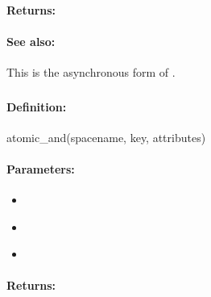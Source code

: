 \paragraph{Returns:}


\paragraph{See also:}  This is the asynchronous form of .

\pagebreak
\subsubsection{}
\label{api:ruby:atomic_and}


\paragraph{Definition:}
\begin{rubycode}
atomic_and(spacename, key, attributes)
\end{rubycode}

\paragraph{Parameters:}
\begin{itemize}[noitemsep]
\item {}\\

\item {}\\

\item {}\\

\end{itemize}

\paragraph{Returns:}


\pagebreak
\subsubsection{}
\label{api:ruby:async_atomic_and}


